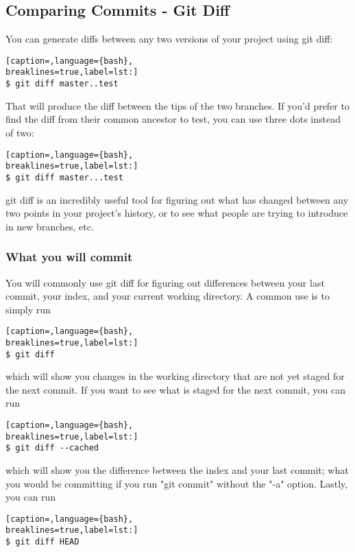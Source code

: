 \subsection{Comparing Commits - Git Diff}
You can generate diffs between any two versions of your project using git diff:
\lstset{basicstyle=\scriptsize, numbers=none, captionpos=b, tabsize=4}
\begin{lstlisting}[caption=,language={bash},
breaklines=true,label=lst:]
$ git diff master..test
\end{lstlisting}

That will produce the diff between the tips of the two branches. If you'd
prefer to find the diff from their common ancestor to test, you can use three
dots instead of two:
\lstset{basicstyle=\scriptsize, numbers=none, captionpos=b, tabsize=4}
\begin{lstlisting}[caption=,language={bash},
breaklines=true,label=lst:]
$ git diff master...test
\end{lstlisting}

git diff is an incredibly useful tool for figuring out what has changed between
any two points in your project's history, or to see what people are trying to
introduce in new branches, etc.

\subsubsection{What you will commit}
You will commonly use git diff for figuring out differences between your last
commit, your index, and your current working directory. A common use is to
simply run
\lstset{basicstyle=\scriptsize, numbers=none, captionpos=b, tabsize=4}
\begin{lstlisting}[caption=,language={bash},
breaklines=true,label=lst:]
$ git diff
\end{lstlisting}

which will show you changes in the working directory that are not yet staged
for the next commit. If you want to see what is staged for the next commit, you
can run
\lstset{basicstyle=\scriptsize, numbers=none, captionpos=b, tabsize=4}
\begin{lstlisting}[caption=,language={bash},
breaklines=true,label=lst:]
$ git diff --cached
\end{lstlisting}

which will show you the difference between the index and your last commit; what
you would be committing if you run "git commit" without the "-a" option.
Lastly, you can run
\lstset{basicstyle=\scriptsize, numbers=none, captionpos=b, tabsize=4}
\begin{lstlisting}[caption=,language={bash},
breaklines=true,label=lst:]
$ git diff HEAD
\end{lstlisting}

